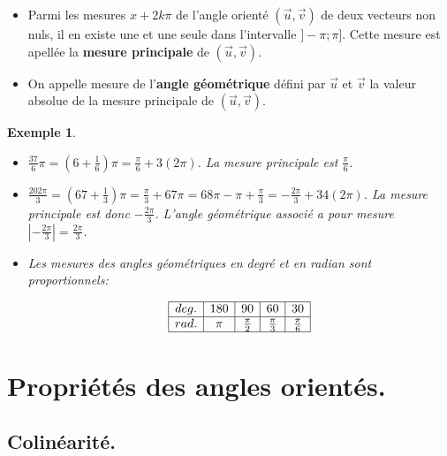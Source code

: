 \documentclass[a4paper,11pt]{article}
\theoremstyle{break}
\newcounter{enonce}
\newtheorem{exemple}[enonce]{Exemple}
\renewcommand\arraystretch{1.3}
\renewcommand\arraystretch{1.8}
\begin{document}
 \begin{definition}
  \begin{itemize}
   \item Parmi les mesures $x+2k\pi$ de l'angle orienté $(\vec{u},\vec{v})$ de deux vecteurs non nuls,
   il en existe une et une seule dans l'intervalle $]-\pi;\pi]$. Cette mesure est 
   apellée la \textbf{mesure 
   principale} de $(\vec{u},\vec{v})$.
   \item On appelle mesure de l'\textbf{angle géométrique} défini par $\vec{u}$ et $\vec{v}$ la valeur
   absolue de la mesure principale de $(\vec{u},\vec{v})$.
  \end{itemize}

 \end{definition}

 \begin{exemple} \vspace{0.1cm}~
 
 \begin{itemize}
  \item $\frac{37}{6}\pi=(6+\frac{1}{6})\pi=\frac{\pi}{6}+3(2\pi)$. La mesure principale est $\frac{\pi}{6}$.
  \item $\frac{202\pi}{3}=(67+\frac{1}{3})\pi=\frac{\pi}{3}+67\pi=68\pi - \pi+\frac{\pi}{3}=-\frac{2\pi}{3}
  +34(2\pi)$. La mesure principale est donc $-\frac{2\pi}{3}$. L'angle géométrique associé a pour mesure
  $|-\frac{2\pi}{3}|=\frac{2\pi}{3}$.
  \item Les mesures des angles géométriques en degré et en radian sont proportionnels:
  
  \renewcommand{\arraystretch}{2.2}
 $$
\begin{array}{|c|c|c|c|c|}

\hline
    deg.&180&90&60&30\\
    \hline
    rad.&\pi&\frac{\pi}{2}&\frac{\pi}{3}&\frac{\pi}{6}\\
    \hline
    \end{array} 
$$  
 \end{itemize}

 
 \end{exemple}
 
 \section{Propriétés des angles orientés.}
 
 \subsection{Colinéarité.}
 
\end{document}
